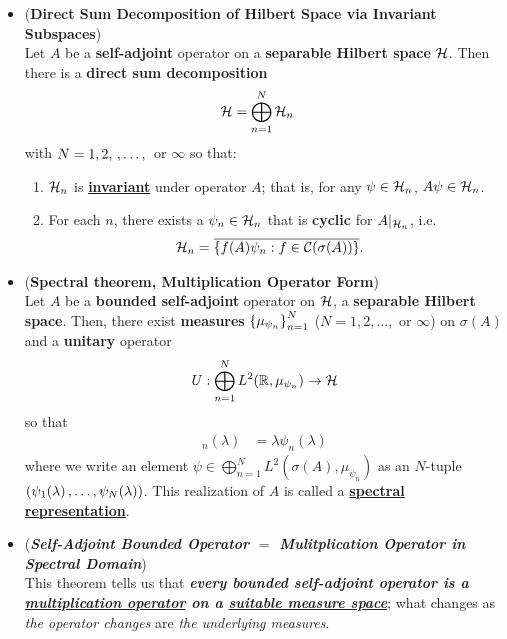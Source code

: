 \documentclass[11pt]{article}
\begin{document}
\begin{itemize}
\item \begin{lemma} (\textbf{Direct Sum Decomposition of Hilbert Space via Invariant Subspaces}) \citep{reed1980methods}\\
Let $A$ be a \textbf{self-adjoint} operator on a \textbf{separable Hilbert space} ${\mathcal H}$. Then there is a \textbf{direct sum decomposition} 
\begin{align*}
{\mathcal H} &= \bigoplus_{n=1}^{N}{\mathcal H}_{n}
\end{align*}
with $N= 1, 2, \,{,}\ldots{,}\,$ or $\infty$ so that: 
\begin{enumerate}
\item ${\mathcal H}_n$ is \underline{\textbf{invariant}} under operator $A$; that is, for any $\psi \in {\mathcal H}_n$, $A \psi \in {\mathcal H}_n$.
\item For each $n$, there exists a $\psi_n \in {\mathcal H}_n$ that is \textbf{cyclic} for $A|_{{\mathcal H}_n}$, i.e. 
\begin{align*}
{\mathcal H}_n &= \overline{\left\{ f(A)\psi_{n} : f \in {\mathcal C}(\sigma(A))\right\}}.
\end{align*}
\end{enumerate}
\end{lemma}

\item \begin{theorem} (\textbf{Spectral theorem, Multiplication Operator Form})  \citep{reed1980methods}\\
Let $A$ be a \textbf{bounded self-adjoint} operator on ${\mathcal H}$, a \textbf{separable Hilbert space}. Then,  there exist \textbf{measures} $\left\{\mu_{\psi_n}\right\}_{n=1}^{N}$ ($N = 1,2, \ldots, $ or $\infty$) on $\sigma(A)$ and a \textbf{unitary} operator 
\begin{align*}
U:  \bigoplus_{n=1}^{N}L^2({\mathbb R}, \mu_{\psi_n}) \rightarrow {\mathcal H}
\end{align*}
so that 
\begin{align}
[U^{-1} A U \psi]_n(\lambda) &= \lambda  \psi_n(\lambda) \label{eqn: spectral_decomposition_hilbert_space}
\end{align} 
where we write an element $\psi \in \bigoplus_{n=1}^{N}L^2(\sigma(A), \mu_{\psi_n})$ as an $N$-tuple 
$(\psi_1(\lambda) \,{,}\ldots{,}\, \psi_{N}(\lambda))$. This realization of $A$ is called a \underline{\textbf{spectral representation}}. 
\end{theorem}

\item \begin{remark} (\textbf{\emph{Self-Adjoint Bounded Operator $=$ Mulitplication Operator in Spectral Domain}})\\
This theorem tells us that \emph{\textbf{every bounded self-adjoint operator is a \underline{multiplication operator} on a \underline{suitable measure space}}}; what changes as \emph{the operator  changes} are \emph{the underlying measures}. 
\end{remark}


\end{itemize}
\end{document}
